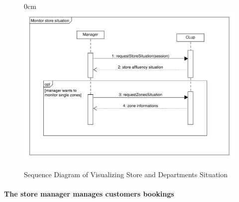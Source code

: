 \documentclass{article}
\begin{document}
\begin{center}
\begin{itemize}
				\end{itemize}
			
					\begin{figure}[!h]
						\begin{adjustwidth} {0cm}{}
							\centering
							\includegraphics[scale=0.25]{SD/8_monitorStoreSituation.pdf}\\
							\caption{Sequence Diagram of Visualizing Store and Departments Situation}
						\end{adjustwidth}
					\end{figure}
					
				\end{center}
			
			\newpage
			\paragraph{The store manager manages customers bookings}
			
\end{document}
